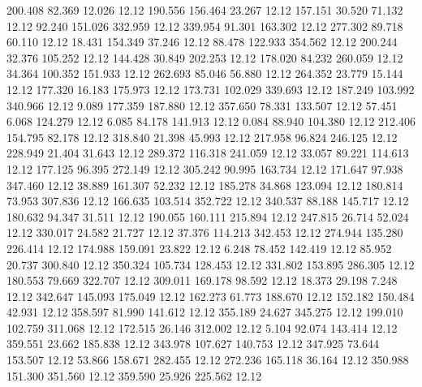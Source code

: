  200.408   82.369   12.026        12.12
 190.556  156.464   23.267        12.12
 157.151   30.520   71.132        12.12
  92.240  151.026  332.959        12.12
 339.954   91.301  163.302        12.12
 277.302   89.718   60.110        12.12
  18.431  154.349   37.246        12.12
  88.478  122.933  354.562        12.12
 200.244   32.376  105.252        12.12
 144.428   30.849  202.253        12.12
 178.020   84.232  260.059        12.12
  34.364  100.352  151.933        12.12
 262.693   85.046   56.880        12.12
 264.352   23.779   15.144        12.12
 177.320   16.183  175.973        12.12
 173.731  102.029  339.693        12.12
 187.249  103.992  340.966        12.12
   9.089  177.359  187.880        12.12
 357.650   78.331  133.507        12.12
  57.451    6.068  124.279        12.12
   6.085   84.178  141.913        12.12
   0.084   88.940  104.380        12.12
 212.406  154.795   82.178        12.12
 318.840   21.398   45.993        12.12
 217.958   96.824  246.125        12.12
 228.949   21.404   31.643        12.12
 289.372  116.318  241.059        12.12
  33.057   89.221  114.613        12.12
 177.125   96.395  272.149        12.12
 305.242   90.995  163.734        12.12
 171.647   97.938  347.460        12.12
  38.889  161.307   52.232        12.12
 185.278   34.868  123.094        12.12
 180.814   73.953  307.836        12.12
 166.635  103.514  352.722        12.12
 340.537   88.188  145.717        12.12
 180.632   94.347   31.511        12.12
 190.055  160.111  215.894        12.12
 247.815   26.714   52.024        12.12
 330.017   24.582   21.727        12.12
  37.376  114.213  342.453        12.12
 274.944  135.280  226.414        12.12
 174.988  159.091   23.822        12.12
   6.248   78.452  142.419        12.12
  85.952   20.737  300.840        12.12
 350.324  105.734  128.453        12.12
 331.802  153.895  286.305        12.12
 180.553   79.669  322.707        12.12
 309.011  169.178   98.592        12.12
  18.373   29.198    7.248        12.12
 342.647  145.093  175.049        12.12
 162.273   61.773  188.670        12.12
 152.182  150.484   42.931        12.12
 358.597   81.990  141.612        12.12
 355.189   24.627  345.275        12.12
 199.010  102.759  311.068        12.12
 172.515   26.146  312.002        12.12
   5.104   92.074  143.414        12.12
 359.551   23.662  185.838        12.12
 343.978  107.627  140.753        12.12
 347.925   73.644  153.507        12.12
  53.866  158.671  282.455        12.12
 272.236  165.118   36.164        12.12
 350.988  151.300  351.560        12.12
 359.590   25.926  225.562        12.12
